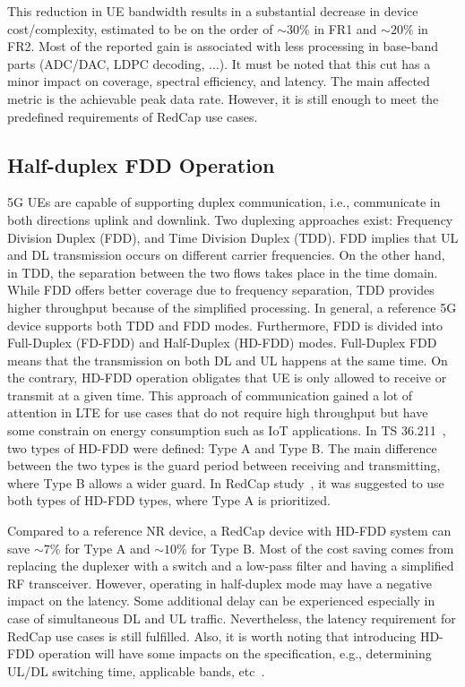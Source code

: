 \documentclass[]{IEEEtran}
\begin{document}
This reduction in UE bandwidth results in a substantial decrease in device cost/complexity, estimated to be on the order of $\sim30\%$ in FR1 and $\sim20\%$ in  FR2.
Most of the reported gain is associated with less processing in base-band parts (ADC/DAC, LDPC decoding, ...).
It must be noted that this cut has a minor impact on coverage, spectral efficiency, and latency.
The main affected metric is the achievable peak data rate.
However, it is still enough to meet the predefined requirements of RedCap use cases.

\subsection{Half-duplex FDD Operation}
\label{sec:4-3}
5G UEs are capable of supporting duplex communication, i.e., communicate in both directions uplink and downlink.
Two duplexing approaches exist: Frequency Division Duplex (FDD), and Time Division Duplex (TDD).
FDD implies that UL and DL transmission occurs on different carrier frequencies.
On the other hand, in TDD, the separation between the two flows takes place in the time domain.
While FDD offers better coverage due to frequency separation, TDD provides higher throughput because of the simplified processing.
In general, a reference 5G device supports both TDD and FDD modes.
Furthermore, FDD is divided into Full-Duplex (FD-FDD) and Half-Duplex (HD-FDD) modes. 
Full-Duplex FDD means that the transmission on both DL and UL happens at the same time.
On the contrary, HD-FDD operation obligates that UE is only allowed to receive or transmit at a given time.
This approach of communication gained a lot of attention in LTE for use cases that do not require high throughput but have some constrain on energy consumption such as IoT applications.
In TS 36.211~\cite{3gpp_evolved_nodate_36.211}, two types of HD-FDD were defined: Type A and Type B.
The main difference between the two types is the guard period between receiving and transmitting, where Type B allows a wider guard.
In RedCap study~\cite{3gpp_study_2021_38.875}, it was suggested to use both types of HD-FDD types, where Type A is prioritized.

Compared to a reference NR device, a RedCap device with HD-FDD system can save $\sim7\%$ for Type A and $\sim10\%$ for Type B.
Most of the cost saving comes from replacing the duplexer with a switch and a low-pass filter and having a simplified RF transceiver.
However, operating in half-duplex mode may have a negative impact on the latency.
Some additional delay can be experienced especially in case of simultaneous DL and UL traffic.
Nevertheless, the latency requirement for RedCap use cases is still fulfilled.
Also, it is worth noting that introducing HD-FDD operation will have some impacts on the specification, e.g., determining UL/DL switching time, applicable bands, etc~\cite{ratasuk_reduced_2021}. 
\end{document}
